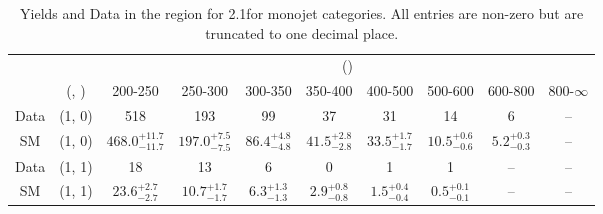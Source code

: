 \begin{table}[h!]
\tiny
\centering
\caption{Yields and Data in the \mmj region for 2.1\ifb for monojet categories. All entries are non-zero but are truncated to one decimal place.\label{tab:yieldsallqcd_mumu_comb_mono}}
\begin{tabular}
{cccccccccc}
	\hline\hline
	&	& \multicolumn{8}{c}{\scalht (\gev)}\\ 
	&	 (\njet, \nb) & 200-250 & 250-300 & 300-350 & 350-400 & 400-500 & 500-600 & 600-800 & 800-$\infty$ \\ [0.8ex] 
\hline
	Data & (1, 0) & 518 & 193 & 99 & 37 & 31 & 14 & 6 & -- \\[0.5ex] 
	SM & (1, 0) & $468.0^{+ 11.7 }_{- 11.7 }$ & $197.0^{+ 7.5 }_{- 7.5 }$ & $86.4^{+ 4.8 }_{- 4.8 }$ & $41.5^{+ 2.8 }_{- 2.8 }$ & $33.5^{+ 1.7 }_{- 1.7 }$ & $10.5^{+ 0.6 }_{- 0.6 }$ & $5.2^{+ 0.3 }_{- 0.3 }$ & -- \\[0.5ex] 
	Data & (1, 1) & 18 & 13 & 6 & 0 & 1 & 1 & -- & -- \\[0.5ex] 
	SM & (1, 1) & $23.6^{+ 2.7 }_{- 2.7 }$ & $10.7^{+ 1.7 }_{- 1.7 }$ & $6.3^{+ 1.3 }_{- 1.3 }$ & $2.9^{+ 0.8 }_{- 0.8 }$ & $1.5^{+ 0.4 }_{- 0.4 }$ & $0.5^{+ 0.1 }_{- 0.1 }$ & -- & -- \\[0.5ex] 
	\hline
	\hline
\end{tabular}
\end{table}
